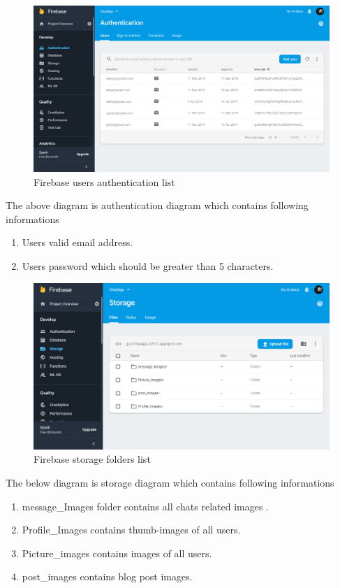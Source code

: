 \begin{figure}[!ht]
	\centering
	\includegraphics[scale=0.3]{databasetwo.png}
	\caption{\label{img9}  Firebase users authentication list}
\end{figure}
\noindent
The above diagram is authentication diagram which contains following informations
\begin{enumerate}
	\setlength{\itemsep}{-0.3em}
	\item Users valid email address.\\
	\item Users password which should be greater than 5 characters.\\
\end{enumerate}

\begin{figure}[!ht]
	\centering
	\includegraphics[scale=0.3]{databasethree.png}
	\caption{\label{img10}  Firebase storage folders list}
\end{figure}
\noindent
The below diagram is storage diagram which contains following informations
\begin{enumerate}
	\setlength{\itemsep}{-0.3em}
	\item message\_Images folder contains all chats related images .\\
	\item Profile\_Images contains thumb-images of all users.\\
	\item Picture\_images contains images of all users.\\
	\item post\_images contains blog post images. 
\end{enumerate}

